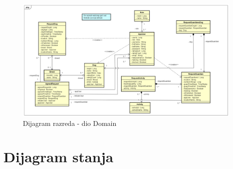 			\begin{figure}[htb]
				\centering
				\includegraphics[width=15cm]{slike/Dijagram razreda - Domain}
				\caption{Dijagram razreda - dio Domain}
				\label{fig:Class-Diagram}
			\end{figure}
	
			\eject
		
		\section{Dijagram stanja}
			
			
			
			
